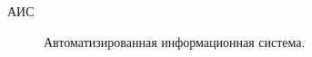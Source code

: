 \Abbreviations %
\begin{description}
\item[АИС] Автоматизированная информационная система.
\end{description}


